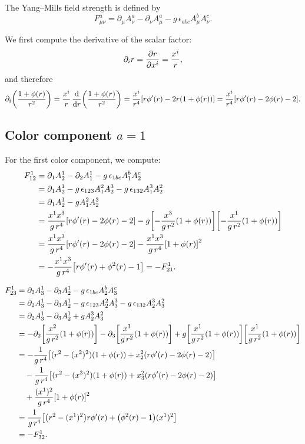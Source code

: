 \documentclass[12pt, a4paper]{article}
\begin{document}

The Yang--Mills field strength is defined by
\[
F_{\mu\nu}^a
=
\partial_\mu A_\nu^a
- \partial_\nu A_\mu^a
- g\,\epsilon_{abc} A_\mu^b A_\nu^c.
\]

We first compute the derivative of the scalar factor:
\[
\partial_i r = \pdv{r}{x^i} = \frac{x^i}{r},
\]
and therefore
\[
\partial_i\qty(\frac{1+\phi(r)}{r^2})
=
\frac{x^i}{r}\,\dv{r}\qty(\frac{1+\phi(r)}{r^2})
=
\frac{x^i}{r^4}\qty[r\phi'(r)-2r(1+\phi(r))]
=
\frac{x^i}{r^4}\qty[r\phi'(r)-2\phi(r)-2].
\]

\subsection*{Color component $a=1$}

For the first color component, we compute:
\[
\begin{aligned}
F_{12}^1
&=
\partial_1 A_2^1 - \partial_2 A_1^1 - g\,\epsilon_{1bc} A_1^b A_2^c \\
&=
\partial_1 A_2^1 - g\,\epsilon_{123} A_1^2 A_2^3 - g\,\epsilon_{132} A_1^3 A_2^2 \\
&=
\partial_1 A_2^1 - g A_1^2 A_2^3 \\
&=
\frac{x^1 x^3}{g\,r^4}\qty[r\phi'(r)-2\phi(r)-2]
- g\qty[-\frac{x^3}{g\,r^2}\qty(1+\phi(r))]\qty[-\frac{x^1}{g\,r^2}\qty(1+\phi(r))] \\
&=
\frac{x^1 x^3}{g\,r^4}\qty[r\phi'(r)-2\phi(r)-2]
- \frac{x^1 x^3}{g\,r^4}\qty[1+\phi(r)]^2 \\
&=
-\frac{x^1 x^3}{g\,r^4}\qty[r\phi'(r)+\phi^2(r)-1]
= -F_{21}^1.
\end{aligned}
\]

\[
\begin{aligned}
F_{23}^1
&=
\partial_2 A_3^1 - \partial_3 A_2^1 - g\,\epsilon_{1bc} A_2^b A_3^c \\
&=
\partial_2 A_3^1 - \partial_3 A_2^1
- g\,\epsilon_{123} A_2^2 A_3^3
- g\,\epsilon_{132} A_2^3 A_3^2 \\
&=
\partial_2 A_3^1 - \partial_3 A_2^1 + g A_2^3 A_3^2 \\
&=
-\partial_2\qty[\frac{x^2}{g\,r^2}\qty(1+\phi(r))]
-\partial_3\qty[\frac{x^3}{g\,r^2}\qty(1+\phi(r))]
+ g\qty[\frac{x^1}{g\,r^2}\qty(1+\phi(r))]\qty[\frac{x^1}{g\,r^2}\qty(1+\phi(r))] \\
&=
-\frac{1}{g\,r^4}\qty[(r^2-(x^2)^2)\qty(1+\phi(r)) + x_2^2\qty(r\phi'(r)-2\phi(r)-2)] \\
&\quad
-\frac{1}{g\,r^4}\qty[(r^2-(x^3)^2)\qty(1+\phi(r)) + x_3^2\qty(r\phi'(r)-2\phi(r)-2)] \\
&\quad
+ \frac{(x^1)^2}{g\,r^4}\qty[1+\phi(r)]^2 \\
&=
\frac{1}{g\,r^4}
\qty[
\qty(r^2-(x^1)^2) r\phi'(r)
+ \qty(\phi^2(r)-1)(x^1)^2
] \\
&=
-F_{32}^1.
\end{aligned}
\]
\end{document}
